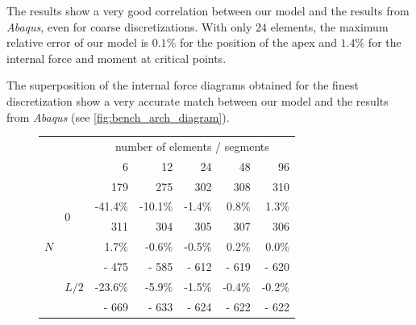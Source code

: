 The results show a very good correlation between our model and the results from \emph{Abaqus}, even for coarse discretizations. With only $24$ elements, the maximum relative error of our model is $0.1\%$ for the position of the apex and $1.4\%$ for the internal force and moment at critical points.

The superposition of the internal force diagrams obtained for the finest discretization show a very accurate match between our model and the results from \emph{Abaqus} (see \cref{fig:bench_arch_diagram}).

\begin{figure}[p]
	\centering
	\begin{fullpage}
\begin{tabularx}{0.6\textwidth}{@{} XX rrrrr@{}}
\toprule
& & \multicolumn{5}{c}{number of elements / segments} \\ \cmidrule{3-7}
&  &  6 & 12 & 24 & 48 & 96 \\ 
\midrule
\multirow{12}{*}{$N$}&\multirow{4}{*}{$0$}&{\color{Tblue}\normalsize 179}&{\color{Tblue}\normalsize 275}&{\color{Tblue}\normalsize 302}&{\color{Tblue}\normalsize 308}&{\color{Tblue}\normalsize 310}\\
&&{\color{Tblue}\scriptsize-41.4\%}&{\color{Tblue}\scriptsize-10.1\%}&{\color{Tblue}\scriptsize-1.4\%}&{\color{Tblue}\scriptsize0.8\%}&{\color{Tblue}\scriptsize1.3\%}\\
&&{\color{black}\normalsize 311}&{\color{black}\normalsize 304}&{\color{black}\normalsize 305}&{\color{black}\normalsize 307}&{\color{black}\normalsize 306}\\
&&{\color{black}\scriptsize1.7\%}&{\color{black}\scriptsize-0.6\%}&{\color{black}\scriptsize-0.5\%}&{\color{black}\scriptsize0.2\%}&{\color{black}\scriptsize0.0\%}\\\cmidrule[0.5\cmidrulewidth]{2-7}
&\multirow{4}{*}{$L/2$}&{\color{Tblue}\normalsize- 475}&{\color{Tblue}\normalsize- 585}&{\color{Tblue}\normalsize- 612}&{\color{Tblue}\normalsize- 619}&{\color{Tblue}\normalsize- 620}\\
&&{\color{Tblue}\scriptsize-23.6\%}&{\color{Tblue}\scriptsize-5.9\%}&{\color{Tblue}\scriptsize-1.5\%}&{\color{Tblue}\scriptsize-0.4\%}&{\color{Tblue}\scriptsize-0.2\%}\\
&&{\color{black}\normalsize- 669}&{\color{black}\normalsize- 633}&{\color{black}\normalsize- 624}&{\color{black}\normalsize- 622}&{\color{black}\normalsize- 622}\\

\end{tabularx}
\end{fullpage}
\end{figure}
